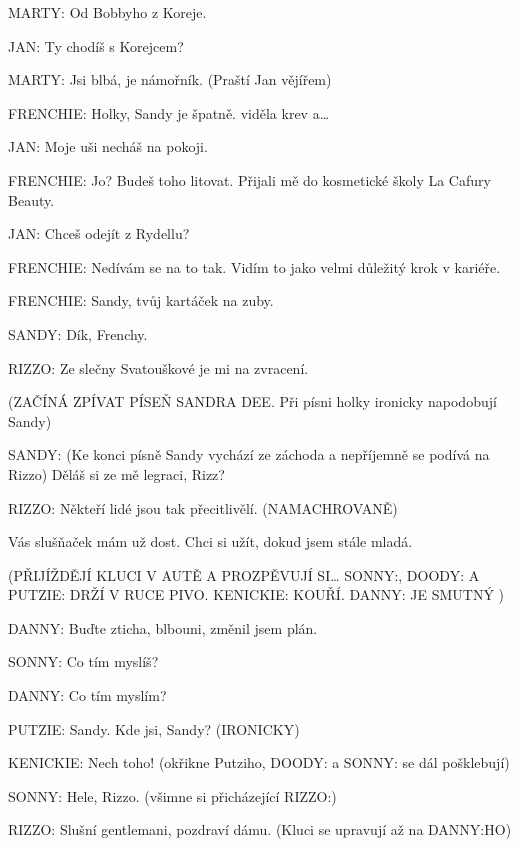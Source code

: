 \rep MARTY:        Od Bobbyho z Koreje.

\rep JAN:        Ty chodíš s Korejcem? 

\rep MARTY:        Jsi blbá, je námořník. (Praští Jan vějířem) 

\rep FRENCHIE:        Holky, Sandy je špatně. viděla krev a…

\rep JAN:        Moje uši necháš na pokoji.

\rep FRENCHIE:        Jo? Budeš toho litovat. Přijali mě do kosmetické školy La Cafury Beauty.

\rep JAN:        Chceš odejít z Rydellu?

\rep FRENCHIE:        Nedívám se na to tak. Vidím to jako velmi důležitý krok v kariéře.

\rep FRENCHIE:        Sandy, tvůj kartáček na zuby.

\rep SANDY:        Dík, Frenchy. 

\rep RIZZO:        Ze slečny Svatouškové je mi na zvracení.

        (ZAČÍNÁ ZPÍVAT PÍSEŇ SANDRA DEE. Při písni holky ironicky                 napodobují Sandy)

\rep SANDY:        (Ke konci písně Sandy vychází ze záchoda a nepříjemně se podívá na         Rizzo)  Děláš si ze mě legraci, Rizz?

\rep RIZZO:        Někteří lidé jsou tak přecitlivělí. (NAMACHROVANĚ) 

        Vás slušňaček mám už dost. Chci si užít, dokud jsem stále mladá.





(PŘIJÍŽDĚJÍ KLUCI V AUTĚ A PROZPĚVUJÍ SI… \rep SONNY:, \rep DOODY: A \rep PUTZIE:         DRŽÍ V RUCE PIVO. \rep KENICKIE: KOUŘÍ. \rep DANNY: JE SMUTNÝ )

\rep DANNY:        Buďte zticha, blbouni, změnil jsem plán.

\rep SONNY:        Co tím myslíš?

\rep DANNY:        Co tím myslím? 

\rep PUTZIE:        Sandy. Kde jsi, Sandy? (IRONICKY)

\rep KENICKIE:        Nech toho! (okřikne Putziho, \rep DOODY: a \rep SONNY: se dál pošklebují)

\rep SONNY:        Hele, Rizzo. (všimne si přicházející RIZZO\rep :)

\rep RIZZO:        Slušní gentlemani,  pozdraví dámu. (Kluci se upravují až na \rep DANNY:HO)

